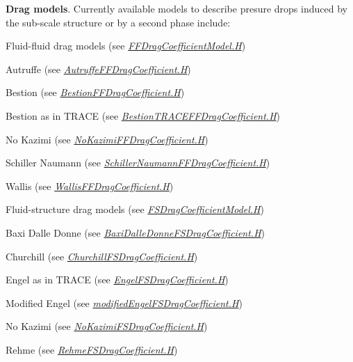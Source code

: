  {\bfseries Drag models}. Currently available models to describe presure drops induced by the sub-\/scale structure or by a second phase include\+: 
\begin{DoxyItemize}
\item Fluid-\/fluid drag models (see {\itshape \hyperlink{FFDragCoefficientModel_8H}{F\+F\+Drag\+Coefficient\+Model.\+H}}) 
\begin{DoxyItemize}
\item Autruffe (see {\itshape \hyperlink{AutruffeFFDragCoefficient_8H}{Autruffe\+F\+F\+Drag\+Coefficient.\+H}}) 
\item Bestion (see {\itshape \hyperlink{BestionFFDragCoefficient_8H}{Bestion\+F\+F\+Drag\+Coefficient.\+H}}) 
\item Bestion as in T\+R\+A\+CE (see {\itshape \hyperlink{BestionTRACEFFDragCoefficient_8H}{Bestion\+T\+R\+A\+C\+E\+F\+F\+Drag\+Coefficient.\+H}}) 
\item No Kazimi (see {\itshape \hyperlink{NoKazimiFFDragCoefficient_8H}{No\+Kazimi\+F\+F\+Drag\+Coefficient.\+H}}) 
\item Schiller Naumann (see {\itshape \hyperlink{SchillerNaumannFFDragCoefficient_8H}{Schiller\+Naumann\+F\+F\+Drag\+Coefficient.\+H}}) 
\item Wallis (see {\itshape \hyperlink{WallisFFDragCoefficient_8H}{Wallis\+F\+F\+Drag\+Coefficient.\+H}}) 
\end{DoxyItemize}
\item Fluid-\/structure drag models (see {\itshape \hyperlink{FSDragCoefficientModel_8H}{F\+S\+Drag\+Coefficient\+Model.\+H}}) 
\begin{DoxyItemize}
\item Baxi Dalle Donne (see {\itshape \hyperlink{BaxiDalleDonneFSDragCoefficient_8H}{Baxi\+Dalle\+Donne\+F\+S\+Drag\+Coefficient.\+H}}) 
\item Churchill (see {\itshape \hyperlink{ChurchillFSDragCoefficient_8H}{Churchill\+F\+S\+Drag\+Coefficient.\+H}}) 
\item Engel as in T\+R\+A\+CE (see {\itshape \hyperlink{EngelFSDragCoefficient_8H}{Engel\+F\+S\+Drag\+Coefficient.\+H}}) 
\item Modified Engel (see {\itshape \hyperlink{modifiedEngelFSDragCoefficient_8H}{modified\+Engel\+F\+S\+Drag\+Coefficient.\+H}}) 
\item No Kazimi (see {\itshape \hyperlink{NoKazimiFSDragCoefficient_8H}{No\+Kazimi\+F\+S\+Drag\+Coefficient.\+H}}) 
\item Rehme (see {\itshape \hyperlink{RehmeFSDragCoefficient_8H}{Rehme\+F\+S\+Drag\+Coefficient.\+H}}) 

\end{DoxyItemize}
\end{DoxyItemize}

